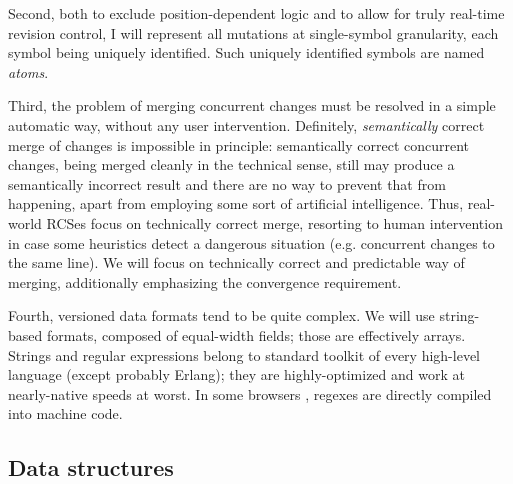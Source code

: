 \documentclass{sig-alternate}
\begin{document}
Second, both to exclude position-dependent logic and to allow for truly real-time revision control, I will represent all mutations at single-symbol granularity, each symbol being uniquely identified.
Such uniquely identified symbols are named \emph{atoms}.

Third, the problem of merging concurrent changes must
be resolved in a simple automatic way, without any user
intervention. Definitely,
\emph{semantically} correct merge of changes is impossible
in principle: semantically correct concurrent
changes, being merged cleanly in
the technical sense, still may produce a semantically
incorrect result and there are no way to prevent that
from happening,
apart from employing some sort of artificial
intelligence. Thus, real-world RCSes focus on technically
correct merge, resorting to human intervention in case
some heuristics detect a dangerous situation (e.g.
concurrent changes to the same line).
We will focus on technically correct and predictable way
of merging, additionally emphasizing the convergence
requirement.

Fourth, versioned data formats tend to be quite complex.
We will use string-based formats, composed of equal-width fields; those are effectively arrays.
Strings and regular expressions belong to standard toolkit of every high-level language (except probably Erlang); they are highly-optimized and work at nearly-native speeds at worst.
In some browsers \cite{wrec,irregex}, regexes are directly compiled into machine code.

\subsection{Data structures}	\label{sec:data}

\newcommand{\aum}{{\fontspec{Devanagari MT}\selectfont ॐ}}
\newcommand{\eoa}{{\fontspec{Geeza Pro}\selectfont ۝}}
\newcommand{\bsp}{{\fontspec{Apple Symbols} ⌫}}
\newcommand{\cnc}{{\fontspec{Apple Symbols} ⌦}}
\newcommand{\zero}{{\fontspec{Apple Symbols} ⌀}}
\end{document}
